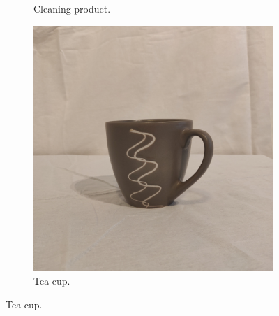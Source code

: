 \documentclass{l4proj}
\begin{document}
\begin{figure}[H]
\begin{subfigure}{0.20\textwidth}
  \caption{Cleaning product.}
  \label{cleaningproduct}
\end{subfigure}\hfil %
\begin{subfigure}{0.20\textwidth}
  \includegraphics[width=\linewidth]{l4template-master/images/cup.png}
  \caption{Tea cup.}
  \label{teacup}
\end{subfigure}


\end{figure}
\end{document}
